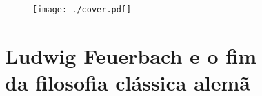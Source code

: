 \documentclass[semcabeco,showtrims,trimframe,11pt,spreadimages,openany]{memoir}
\begin{document}


\pagebreak
\thispagestyle{empty}
\movetoevenpage
\thispagestyle{empty}
\begin{figure}
\texttt{[image: ./cover.pdf]}
\end{figure}

\part[Ludwig Feuerbach e o fim da filosofia clássica alemã]{Ludwig Feuerbach e o fim\\ da filosofia clássica alemã}


\begin{Parallel}[p]{}{} 
\ParallelRText{ } %
\end{Parallel}
\pagebreak
\thispagestyle{empty}
\movetooddpage
{}
\theendnotes


\end{document}
